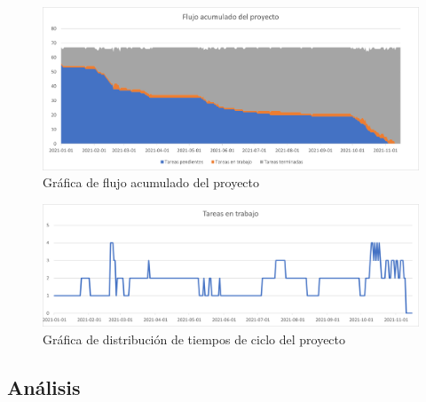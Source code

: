 \begin{figure}[H]
    \centering
    \includegraphics[width=0.8\linewidth]{images/BurndownChart.png}
    \caption{Gráfica de flujo acumulado del proyecto}
    \label{fig:grafica_flujo_acumulado}
\end{figure}
\begin{figure}[H]
    \centering
    \includegraphics[width=0.8\linewidth]{images/TareasEnTrabajo.png}
    \caption{Gráfica de distribución de tiempos de ciclo del proyecto}
    \label{fig:grafica_tiempos_ciclo}
\end{figure}

\subsection{Análisis}
